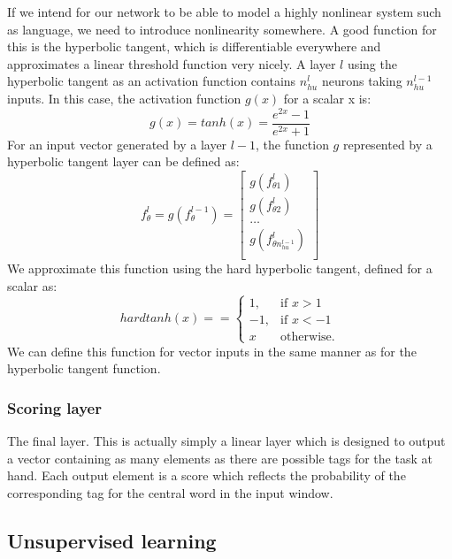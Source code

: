 If we intend for our network to be able to model a highly nonlinear
system such as language, we need to introduce nonlinearity
somewhere. A good function for this is the hyperbolic tangent, which
is differentiable everywhere and approximates a linear threshold
function very nicely. A layer $l$ using the hyperbolic tangent as an
activation function contains $n^l_{hu}$ neurons taking $n^{l-1}_{hu}$
inputs. In this case, the activation function $g(x)$ for a scalar x
is:
\begin{equation}
g(x) = tanh(x) = \frac{e^{2x} - 1}{e^{2x} + 1}
\end{equation}
For an input vector generated by a layer $l - 1$, the function $g$ represented by a hyperbolic tangent layer can be defined as:
\begin{equation}
f^l_{\theta} = g(f^{l-1}_{\theta})
= \left[ \begin{array}{c}
g(f^l_{\theta1}) \\
g(f^l_{\theta2}) \\
\ldots \\
g(f^l_{\theta n^{l-1}_{hu}})\\ \end{array} \right]
\end{equation}
We approximate this function using the hard hyperbolic tangent, defined for a scalar as:
\begin{equation}
hardtanh(x) = = \begin{cases} 1, & \mbox{if } x > 1 \\ -1, & \mbox{if } x < -1 \\ x & \mbox{otherwise.}\end{cases}
\end{equation}
We can define this function for vector inputs in the same manner
as for the hyperbolic tangent function.

\subsubsection{Scoring layer}

The final layer. This is actually simply a linear layer which is
designed to output a vector containing as many elements as there are
possible tags for the task at hand. Each output element is a score
which reflects the probability of the corresponding tag for the
central word in the input window.

\subsection{Unsupervised learning}
\label{sec:unsupervised}

